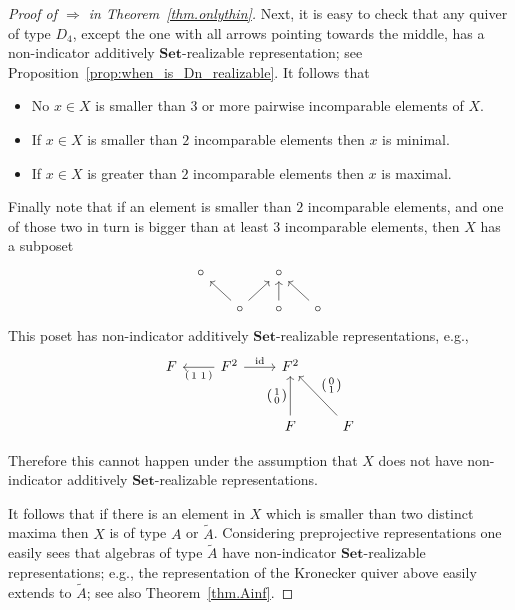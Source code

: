 \documentclass[10pt,a4paper]{amsart}
\newcommand{\Set}{\mathbf{Set}}
\begin{document}
\begin{proof}[Proof of \( \Rightarrow \) in Theorem~\ref{thm.onlythin}]
Next, it is easy to check that any quiver of type \( D_4 \), except the one with all arrows pointing towards the middle, has a non-indicator  additively \( \Set \)-realizable representation; see  Proposition~\ref{prop:when_is_Dn_realizable}. It follows that
\begin{itemize}
\item No \( x  \in X \) is smaller than \( 3 \) or more pairwise incomparable elements of \( X \).
\item If \( x \in X \) is smaller than \( 2 \) incomparable elements then \( x \) is minimal.
\item If \( x \in X \) is greater than \( 2 \) incomparable elements then \( x \) is maximal.
\end{itemize}
Finally note that if an element is smaller than \( 2 \) incomparable elements, and one of those two in turn is bigger than at least \( 3 \) incomparable elements, then \( X \) has a subposet
\[ \begin{tikzcd}[column sep=5mm,row sep=5mm]
\circ && \circ \\
& \circ \ar[lu] \ar[ru] & \circ \ar[u] & \circ \ar[lu]
\end{tikzcd} \]
This poset has non-indicator additively \( \Set \)-realizable representations, e.g.,
\[ \begin{tikzcd}[column sep=8mm,row sep=10mm,ampersand replacement=\&]
F \& F^2  \ar[l, "\left({\begin{smallmatrix}1 & 1\end{smallmatrix}}\right)"] \ar[r, "\text{id}"]\&  F^2 \\
\& \& F \ar[u,"\left({\begin{smallmatrix}1 \\ 0 \end{smallmatrix}}\right)"] \& F \ar[lu,swap,"\left({\begin{smallmatrix}0 \\ 1\end{smallmatrix}}\right)"]
\end{tikzcd} \]

Therefore this cannot happen under the assumption that \( X \) does not have non-indicator additively \( \Set \)-realizable representations.

It follows that if there is an element in \( X \) which is smaller than two distinct maxima then \( X \) is of type \( A \) or \( \widetilde{A} \). Considering preprojective representations one easily sees that algebras of type \( \widetilde{A} \) have non-indicator \( \Set \)-realizable representations; e.g., the representation of the Kronecker quiver above easily extends to $\widetilde{A}$; see also Theorem~\ref{thm.Ainf}.


\end{proof}
\end{document}

